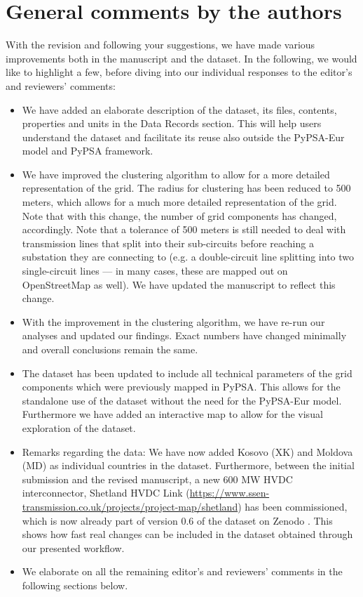 \documentclass{response}
\begin{document}
\section*{General comments by the authors}
With the revision and following your suggestions, we have made various improvements both in the manuscript and the dataset. In the following, we would like to highlight a few, before diving into our individual responses to the editor's and reviewers' comments:
\begin{itemize}
    \item We have added an elaborate description of the dataset, its files, contents, properties and units in the Data Records section. This will help users understand the dataset and facilitate its reuse also outside the PyPSA-Eur model and PyPSA framework.
    \item We have improved the clustering algorithm to allow for a more detailed representation of the grid. The radius for clustering has been reduced to 500 meters, which allows for a much more detailed representation of the grid. Note that with this change, the number of grid components has changed, accordingly. Note that a tolerance of 500 meters is still needed to deal with transmission lines that split into their sub-circuits before reaching a substation they are connecting to (e.g. a double-circuit line splitting into two single-circuit lines --- in many cases, these are mapped out on OpenStreetMap as well). We have updated the manuscript to reflect this change. 
    \item With the improvement in the clustering algorithm, we have re-run our analyses and updated our findings. Exact numbers have changed minimally and overall conclusions remain the same.
    \item The dataset has been updated to include all technical parameters of the grid components which were previously mapped in PyPSA. This allows for the standalone use of the dataset without the need for the PyPSA-Eur model. Furthermore we have added an interactive map to allow for the visual exploration of the dataset.
    \item Remarks regarding the data: We have now added Kosovo (XK) and Moldova (MD) as individual countries in the dataset. Furthermore, between the initial submission and the revised manuscript, a new 600 MW HVDC interconnector, Shetland HVDC Link (\href{https://www.ssen-transmission.co.uk/projects/project-map/shetland}{https://www.ssen-transmission.co.uk/projects/project-map/shetland}) has been commissioned, which is now already part of version 0.6 of the dataset on Zenodo \cite{xiongPrebuiltElectricityNetwork2024}. This shows how fast real changes can be included in the dataset obtained through our presented workflow.
    \item We elaborate on all the remaining editor's and reviewers' comments in the following sections below. 
\end{itemize}
\end{document}

